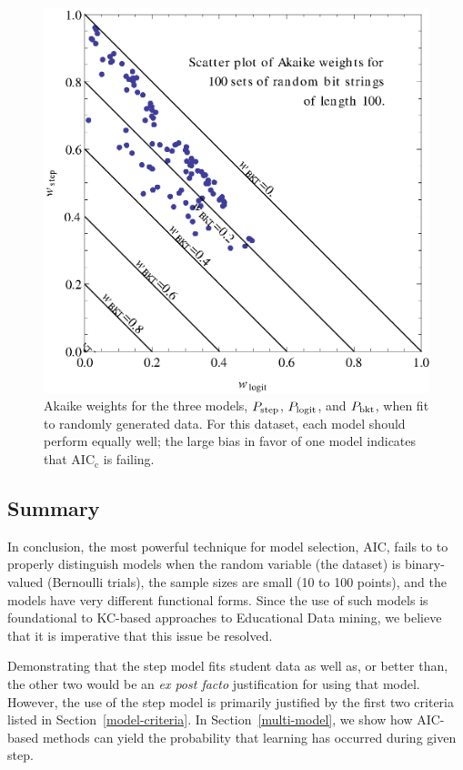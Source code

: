 \documentclass[11pt,letterpaper]{article}
\begin{document}
\begin{figure}
  \centering \includegraphics{scatter-random-weights.eps}
  \caption{Akaike weights for the three models, $P_{\rm step}$,
   $P_{\rm logit}$, and $P_{\rm bkt}$, when fit to randomly
   generated data.  For this dataset, each model should perform
   equally well; the large bias in favor of one model indicates
   that  AIC$_{\mathrm c}$ is failing.}\label{scatter2}
\end{figure}

\subsection{Summary}

In conclusion, the most powerful technique for model selection,
AIC, fails to to properly distinguish models when the random
variable (the dataset) is binary-valued (Bernoulli trials),
the sample sizes are small (10 to 100 points), and the models
have very different functional forms.  Since the use of such
models is foundational to KC-based approaches to Educational
Data mining, we believe that it is imperative that this issue 
be resolved.

Demonstrating that the step model fits student data as well as,
or better than, the other two would be an
{\em ex post facto} justification for using that model.  
However, the use of the step model is primarily justified
by the first two criteria listed in Section~\ref{model-criteria}.
In Section~\ref{multi-model}, we show how AIC-based methods
can yield the probability that learning has occurred during given step.
\end{document}
